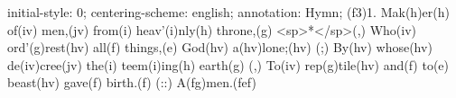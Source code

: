initial-style: 0;
centering-scheme: english;
annotation: Hymn;
(f3)1. Mak(h)er(h) of(iv) men,(jv) from(i) heav'(i)nly(h) throne,(g) <sp>*</sp>(,)
Who(iv) ord'(g)rest(hv) all(f) things,(e) God(hv) a(hv)lone;(hv) (;)
By(hv) whose(hv) de(iv)cree(jv) the(i) teem(i)ing(h) earth(g) (,)
To(iv) rep(g)tile(hv) and(f) to(e) beast(hv) gave(f) birth.(f) (::) A(fg)men.(fef)
